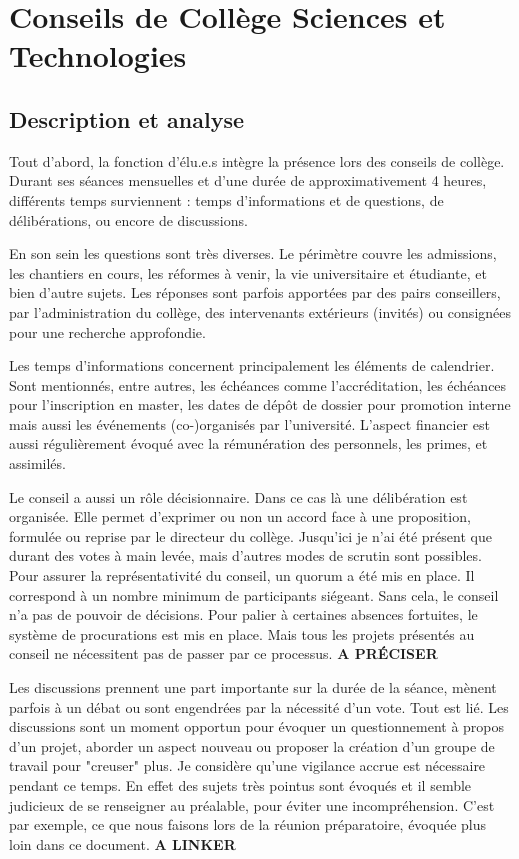 \documentclass{article}
\begin{document}
\section{Conseils de Collège Sciences et Technologies}

\subsection{Description et analyse}
Tout d'abord, la fonction d'élu.e.s intègre la présence lors des conseils de collège. 
Durant ses séances mensuelles et d'une durée de approximativement 4 heures, différents temps surviennent : temps d'informations et de questions, de délibérations, ou encore de discussions.

En son sein les questions sont très diverses. 
Le périmètre couvre les admissions, les chantiers en cours, les réformes à venir, la vie universitaire et étudiante, et bien d'autre sujets. 
Les réponses sont parfois apportées par des pairs conseillers, par l'administration du collège, des intervenants extérieurs (invités) ou consignées pour une recherche approfondie. 

Les temps d'informations concernent principalement les éléments de calendrier. 
Sont mentionnés, entre autres, les échéances comme l'accréditation, les échéances pour l'inscription en master, les dates de dépôt de dossier pour promotion interne mais aussi les événements (co-)organisés par l'université. 
L'aspect financier est aussi régulièrement évoqué avec la rémunération des personnels, les primes, et assimilés.

Le conseil a aussi un rôle décisionnaire. 
Dans ce cas là une délibération est organisée. 
Elle permet d'exprimer ou non un accord face à une proposition, formulée ou reprise par le directeur du collège. 
Jusqu'ici je n'ai été présent que durant des votes à main levée, mais d'autres modes de scrutin sont possibles. \\ 
Pour assurer la représentativité du conseil, un quorum a été mis en place. Il correspond à un nombre minimum de participants siégeant. Sans cela, le conseil n'a pas de pouvoir de décisions. 
Pour palier à certaines absences fortuites, le système de procurations est mis en place. 
Mais tous les projets présentés au conseil ne nécessitent pas de passer par ce processus. \textbf{A PRÉCISER}

Les discussions prennent une part importante sur la durée de la séance, mènent parfois à un débat ou sont engendrées par la nécessité d'un vote. Tout est lié. Les discussions sont un moment opportun pour évoquer un questionnement à propos d'un projet, aborder un aspect nouveau ou proposer la création d'un groupe de travail pour "creuser" plus. Je considère qu'une vigilance accrue est nécessaire pendant ce temps. En effet des sujets très pointus sont évoqués et il semble judicieux de se renseigner au préalable, pour éviter une incompréhension. C'est par exemple, ce que nous faisons lors de la réunion préparatoire, évoquée plus loin dans ce document. \textbf{A LINKER}
\end{document}
